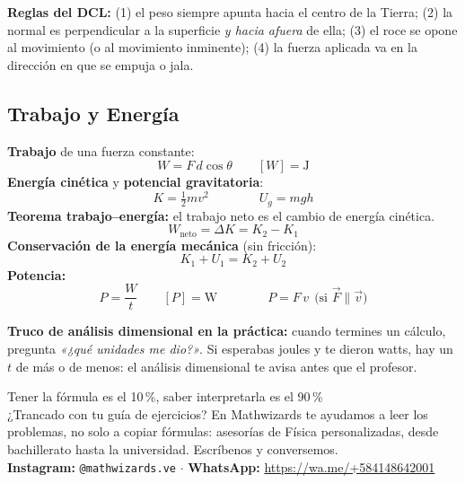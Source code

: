 \documentclass[12pt, letterpaper]{article}
\makeatletter
\newcommand{\mwcta}[2]{%
  \begin{center}
    \begin{minipage}{0.94\linewidth}
      \begin{cuadroextra}
        \centering
        {\nxheav\Large\color{mwprimario}#1}\\[8pt]
        {\small #2}\\[12pt]
        {\footnotesize\color{mwgris}
          \textbf{Instagram:} \texttt{@mathwizards.ve} \quad$\cdot$\quad
          \textbf{WhatsApp:} \url{https://wa.me/+584148642001}}
      \end{cuadroextra}
    \end{minipage}
  \end{center}
}
\makeatother
\begin{document}
\begin{center}
\end{center}

\noindent\textbf{Reglas del DCL:} (1) el peso siempre apunta hacia el centro de la Tierra; (2) la normal es perpendicular a la superficie \emph{y hacia afuera} de ella; (3) el roce se opone al movimiento (o al movimiento inminente); (4) la fuerza aplicada va en la dirección en que se empuja o jala.

\subsection{Trabajo y Energía}

\begin{cuadroteoria}
  \textbf{Trabajo} de una fuerza constante:
  \[
    W = F\,d\cos\theta \qquad [W] = \text{J}
  \]
  \textbf{Energía cinética} y \textbf{potencial gravitatoria}:
  \[
    K = \tfrac{1}{2} m v^2 \qquad\qquad U_g = m g h
  \]
  \textbf{Teorema trabajo--energía:} el trabajo neto es el cambio de energía cinética.
  \[
    W_{\text{neto}} = \Delta K = K_2 - K_1
  \]
  \textbf{Conservación de la energía mecánica} (sin fricción):
  \[
    K_1 + U_1 = K_2 + U_2
  \]
  \textbf{Potencia:}
  \[
    P = \frac{W}{t} \qquad [P] = \text{W} \qquad\qquad P = F\,v \ \ \text{(si } \vec{F} \parallel \vec{v}\text{)}
  \]
\end{cuadroteoria}

\noindent\textbf{Truco de análisis dimensional en la práctica:} cuando termines un cálculo, pregunta \emph{«¿qué unidades me dio?»}. Si esperabas joules y te dieron watts, hay un $t$ de más o de menos: el análisis dimensional te avisa antes que el profesor.

\newpage
\vspace*{\fill}

\mwcta{Tener la fórmula es el 10\,\%, saber interpretarla es el 90\,\%}{¿Trancado con tu guía de ejercicios? En Mathwizards te ayudamos a leer los problemas, no solo a copiar fórmulas: asesorías de Física personalizadas, desde bachillerato hasta la universidad. Escríbenos y conversemos.}

\vspace*{\fill}
\end{document}
